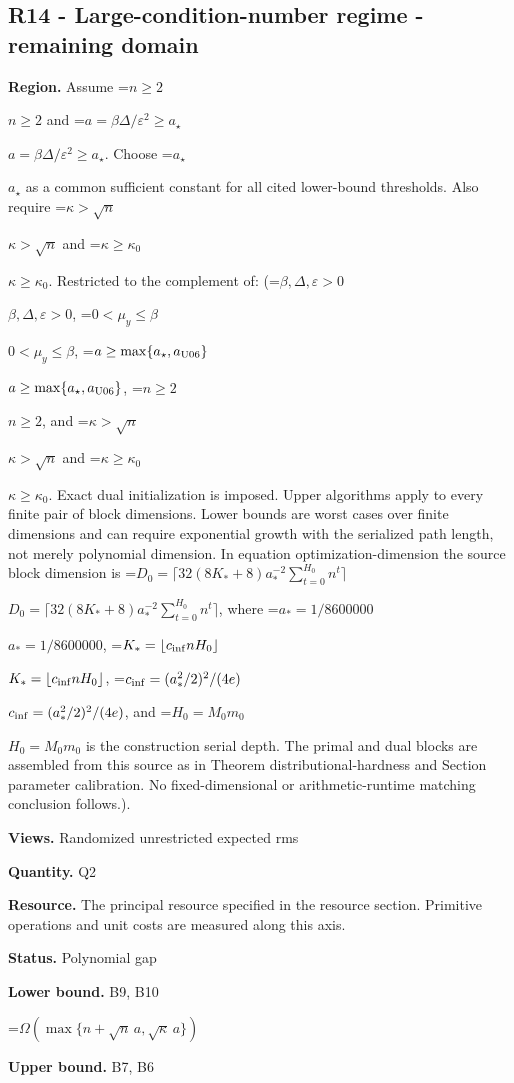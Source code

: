 \documentclass[10pt,a4paper]{article}
\newcommand{\AtlasMath}[1]{\par\begingroup\centering\setbox0=\hbox{$\displaystyle #1$}\ifdim\wd0>1.4\linewidth\typeout{ATLAS WIDE FORMULA: \the\wd0}\fi\ifdim\wd0>\linewidth\resizebox{\linewidth}{!}{\box0}\else\box0\fi\par\endgroup}
\newcommand{\AtlasInlineMath}[1]{\begingroup\setbox0=\hbox{$#1$}\ifdim\wd0>.4\linewidth\endgroup\AtlasMath{#1}\else\endgroup$#1$\fi}
\begin{document}
\subsection{R14 - Large-condition-number regime - remaining domain}


\textbf{Region.} Assume \AtlasInlineMath{n\ge2} and \AtlasInlineMath{a=\beta\Delta/\varepsilon^2\ge a_\star}. Choose \AtlasInlineMath{a_\star} as a common sufficient constant for all cited lower-bound thresholds. Also require \AtlasInlineMath{\kappa>\sqrt n} and \AtlasInlineMath{\kappa\ge\kappa_0}. Restricted to the complement of: (\AtlasInlineMath{\beta,\Delta,\varepsilon>0}, \AtlasInlineMath{0<\mu_y\le\beta}, \AtlasInlineMath{a\ge\max\{a_\star,a_{\rm U06}\}}, \AtlasInlineMath{n\ge2}, and \AtlasInlineMath{\kappa>\sqrt n} and \AtlasInlineMath{\kappa\ge\kappa_0}. Exact dual initialization is imposed. Upper algorithms apply to every finite pair of block dimensions. Lower bounds are worst cases over finite dimensions and can require exponential growth with the serialized path length, not merely polynomial dimension. In equation optimization-dimension the source block dimension is \AtlasInlineMath{D_0=\lceil32(8K_*+8)a_*^{-2}\sum_{t=0}^{H_0}n^t\rceil}, where \AtlasInlineMath{a_*=1/8600000}, \AtlasInlineMath{K_*=\lfloor c_{\rm inf}nH_0\rfloor}, \AtlasInlineMath{c_{\rm inf}=(a_*^2/2)^2/(4e)}, and \AtlasInlineMath{H_0=M_0m_0} is the construction serial depth. The primal and dual blocks are assembled from this source as in Theorem distributional-hardness and Section parameter calibration. No fixed-dimensional or arithmetic-runtime matching conclusion follows.).



\textbf{Views.} Randomized unrestricted expected rms



\textbf{Quantity.} Q2



\textbf{Resource.} The principal resource specified in the resource section. Primitive operations and unit costs are measured along this axis.



\textbf{Status.} Polynomial gap



\textbf{Lower bound.} B9, B10



\AtlasMath{\Omega\!\left(\max\{n+\sqrt n\,a,\sqrt\kappa\,a\}\right)}


\textbf{Upper bound.} B7, B6
\end{document}
